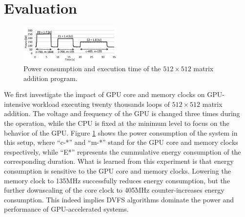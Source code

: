 \section{Evaluation}
\label{sec:evaluation}

\begin{figure}[!t]
\centering
 \includegraphics[width=0.45\textwidth]{figures/madd-time-power.pdf}
 \caption{Power consumption and execution time of the $512\times512$
 matrix addition program.}
 \label{fig:madd-time-power}
\end{figure}

We first investigate the impact of GPU core and memory clocks on
GPU-intensive workload executing twenty thousands loops of $512\times512$
matrix addition.
The voltage and frequency of the GPU is changed three times during the
operation, while the CPU is fixed at the minimum level to focus on the
behavior of the GPU.
Figure \ref{fig:madd-time-power} shows the power consumption of the
system in this setup, where ``c-*'' and ``m-*'' stand for the GPU core
and memory clocks respectively, while ``E*'' represents the cummulative
energy consumption of the corresponding duration.
What is learned from this experiment is that energy consumption is
sensitive to the GPU core and memory clocks.
Lowering the memory clock to 135MHz successfully reduces energy
consumption, but the further downscaling of the core clock to 405MHz
counter-increases energy consumption.
This indeed implies DVFS algorithms dominate the power and performance
of GPU-accelerated systems.

